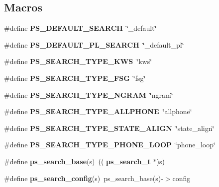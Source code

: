 \subsection*{Macros}
\begin{DoxyCompactItemize}
\item 
\mbox{\label{pocketsphinx__internal_8h_a84a97dd05f15264c6949498feb139671}} 
\#define {\bfseries P\+S\+\_\+\+D\+E\+F\+A\+U\+L\+T\+\_\+\+S\+E\+A\+R\+CH}~\char`\"{}\+\_\+default\char`\"{}
\item 
\mbox{\label{pocketsphinx__internal_8h_a1a7406bb1a164a4428493880ed92f786}} 
\#define {\bfseries P\+S\+\_\+\+D\+E\+F\+A\+U\+L\+T\+\_\+\+P\+L\+\_\+\+S\+E\+A\+R\+CH}~\char`\"{}\+\_\+default\+\_\+pl\char`\"{}
\item 
\mbox{\label{pocketsphinx__internal_8h_adfbaef1de8cda36836738d8abb894a1f}} 
\#define {\bfseries P\+S\+\_\+\+S\+E\+A\+R\+C\+H\+\_\+\+T\+Y\+P\+E\+\_\+\+K\+WS}~\char`\"{}kws\char`\"{}
\item 
\mbox{\label{pocketsphinx__internal_8h_a76b0af36a87ec087673e6a512848ea70}} 
\#define {\bfseries P\+S\+\_\+\+S\+E\+A\+R\+C\+H\+\_\+\+T\+Y\+P\+E\+\_\+\+F\+SG}~\char`\"{}fsg\char`\"{}
\item 
\mbox{\label{pocketsphinx__internal_8h_ab9a7015925f8a6a4e5a7230c2a91c4f7}} 
\#define {\bfseries P\+S\+\_\+\+S\+E\+A\+R\+C\+H\+\_\+\+T\+Y\+P\+E\+\_\+\+N\+G\+R\+AM}~\char`\"{}ngram\char`\"{}
\item 
\mbox{\label{pocketsphinx__internal_8h_a108d71ca2ec794ec4cf4d7c99f63473d}} 
\#define {\bfseries P\+S\+\_\+\+S\+E\+A\+R\+C\+H\+\_\+\+T\+Y\+P\+E\+\_\+\+A\+L\+L\+P\+H\+O\+NE}~\char`\"{}allphone\char`\"{}
\item 
\mbox{\label{pocketsphinx__internal_8h_a3bb128d00e94eb1b227c3a294dd1ce60}} 
\#define {\bfseries P\+S\+\_\+\+S\+E\+A\+R\+C\+H\+\_\+\+T\+Y\+P\+E\+\_\+\+S\+T\+A\+T\+E\+\_\+\+A\+L\+I\+GN}~\char`\"{}state\+\_\+align\char`\"{}
\item 
\mbox{\label{pocketsphinx__internal_8h_a101df5cf65a6ad28766a30c63f2f2746}} 
\#define {\bfseries P\+S\+\_\+\+S\+E\+A\+R\+C\+H\+\_\+\+T\+Y\+P\+E\+\_\+\+P\+H\+O\+N\+E\+\_\+\+L\+O\+OP}~\char`\"{}phone\+\_\+loop\char`\"{}
\item 
\mbox{\label{pocketsphinx__internal_8h_a27058b099b21336e1fd50299f8596171}} 
\#define {\bfseries ps\+\_\+search\+\_\+base}(s)~((\textbf{ ps\+\_\+search\+\_\+t} $\ast$)s)
\item 
\mbox{\label{pocketsphinx__internal_8h_a856f984d97ce3d4ac640f1a9061065cf}} 
\#define {\bfseries ps\+\_\+search\+\_\+config}(s)~ps\+\_\+search\+\_\+base(s)-\/$>$config

\end{DoxyCompactItemize}
